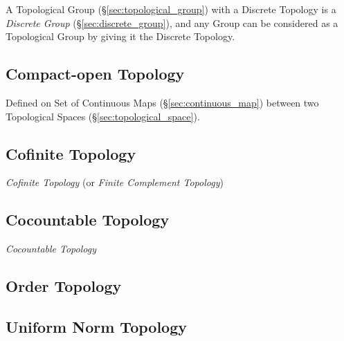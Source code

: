 A Topological Group (\S\ref{sec:topological_group}) with a Discrete Topology is
a \emph{Discrete Group} (\S\ref{sec:discrete_group}), and any Group can be
considered as a Topological Group by giving it the Discrete Topology.



\subsection{Compact-open Topology}\label{sec:compact_open}

Defined on Set of Continuous Maps (\S\ref{sec:continuous_map}) between
two Topological Spaces (\S\ref{sec:topological_space}).



\subsection{Cofinite Topology}\label{sec:cofinite_topology}

\emph{Cofinite Topology} (or \emph{Finite Complement Topology})



\subsection{Cocountable Topology}\label{sec:cocountable_topology}

\emph{Cocountable Topology}



\subsection{Order Topology}\label{sec:order_topology}

\subsection{Uniform Norm Topology}\label{sec:uniform_norm_topology}

